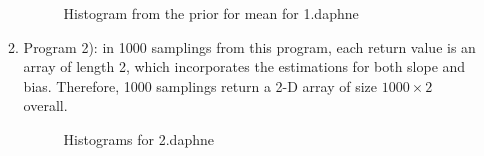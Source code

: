 \documentclass{article}
\begin{document}
\begin{enumerate}
\begin{enumerate}
\begin{figure}[!htp]
	\caption{Histogram from the prior for mean for 1.daphne}
\end{figure}
\item Program 2): in 1000 samplings from this program,  each return value is an array of length 2,  which incorporates the estimations for both slope and bias. Therefore, 1000 samplings return a 2-D array of size $1000\times 2$ overall.
\begin{figure}[!htp] 
    \centering
    \hfill%
        \caption{Histograms for 2.daphne}
\end{figure}


\end{enumerate}
\end{enumerate}
\end{document}
